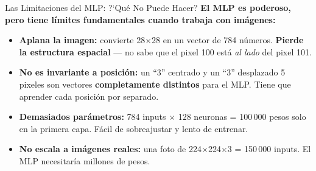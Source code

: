 \documentclass[aspectratio=169, 11pt]{beamer}
\begin{document}
\begin{frame}{Las Limitaciones del MLP: ?`Qu\'e No Puede Hacer?}
  \vspace{-4pt}
  {\footnotesize\color{arcaDark}\bfseries
    El MLP es poderoso, pero tiene l\'imites fundamentales
    cuando trabaja con im\'agenes:}

  \vspace{6pt}
  {\footnotesize
  \begin{itemize}\setlength{\itemsep}{5pt}
    \item[{\color{arcaRed}\scriptsize\faTimesCircle}]
      \textbf{Aplana la imagen:} convierte 28$\times$28 en un vector
      de 784 n\'umeros. \textbf{Pierde la estructura espacial} ---
      no sabe que el pixel 100 est\'a \textit{al lado} del pixel 101.
    \item[{\color{arcaRed}\scriptsize\faTimesCircle}]
      \textbf{No es invariante a posici\'on:} un ``3'' centrado y un
      ``3'' desplazado 5 pixeles son vectores \textbf{completamente
      distintos} para el MLP. Tiene que aprender cada posici\'on
      por separado.
    \item[{\color{arcaRed}\scriptsize\faTimesCircle}]
      \textbf{Demasiados par\'ametros:} 784 inputs $\times$ 128
      neuronas = 100\,000 pesos solo en la primera capa. F\'acil
      de sobreajustar y lento de entrenar.
    \item[{\color{arcaRed}\scriptsize\faTimesCircle}]
      \textbf{No escala a im\'agenes reales:} una foto de
      224$\times$224$\times$3 = 150\,000 inputs. El MLP
      necesitar\'ia millones de pesos.
  \end{itemize}
  }
\end{frame}
\end{document}
